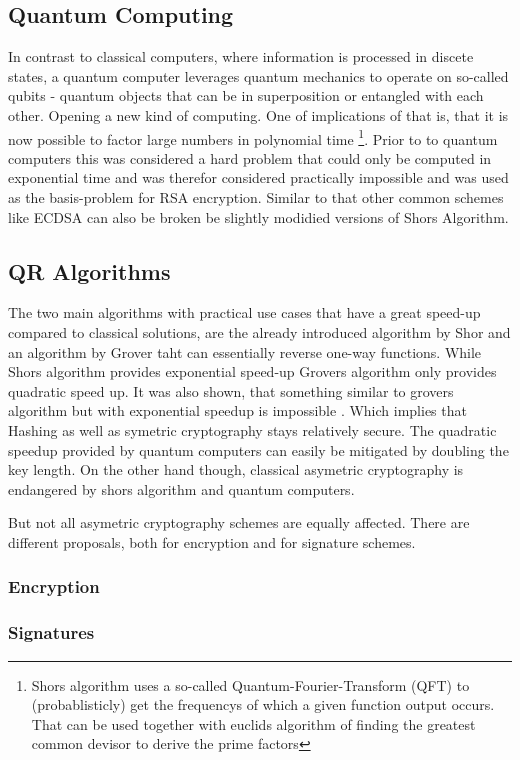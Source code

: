 \documentclass[conference]{IEEEtran}
\begin{document}
\subsection{Quantum Computing}\label{quantum_computing}
In contrast to classical computers, where information is processed in discete states, a quantum computer leverages quantum mechanics to operate on so-called qubits - quantum objects that can be in superposition or entangled with each other. 
Opening a new kind of computing. 
One of implications of that is, that it is now possible to factor large numbers in polynomial time \cite{Shor} \footnote{Shors algorithm uses a so-called Quantum-Fourier-Transform (QFT) to (probablisticly) get the frequencys of which a given function output occurs. That can be used together with euclids algorithm of finding the greatest common devisor to derive the prime factors}. 
Prior to to quantum computers this was considered a hard problem that could only be computed in exponential time and was therefor considered practically impossible and was used as the basis-problem for RSA encryption.
Similar to that other common schemes like ECDSA can also be broken be slightly modidied versions of Shors Algorithm.
\subsection{QR Algorithms}
The two main algorithms with practical use cases that have a great speed-up compared to classical solutions, are the already introduced algorithm by Shor and an algorithm by Grover taht can essentially reverse one-way functions.
While Shors algorithm provides exponential speed-up Grovers algorithm only provides quadratic speed up. It was also shown, that something similar to grovers algorithm but with exponential speedup is impossible \cite{Strengths&Weaknesses_QC}. Which implies that Hashing as well as symetric cryptography stays relatively secure.
The quadratic speedup provided by quantum computers can easily be mitigated by doubling the key length.
On the other hand though, classical asymetric cryptography is endangered by shors algorithm and quantum computers.

But not all asymetric cryptography schemes are equally affected.
There are different proposals, both for encryption and for signature schemes.
\subsubsection{Encryption}
\subsubsection{Signatures} 
\end{document}
